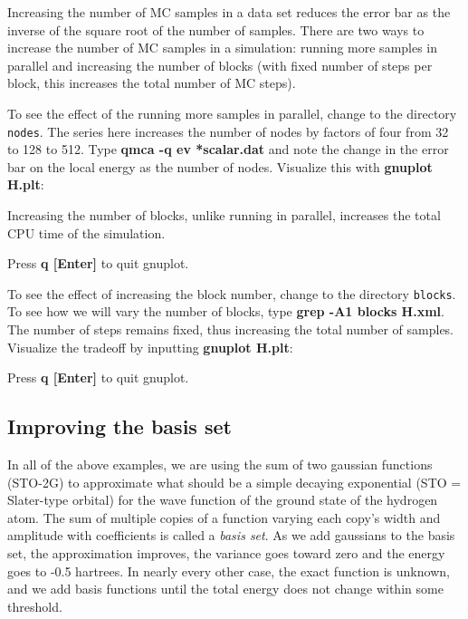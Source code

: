 Increasing the number of MC samples in a data set reduces the error bar as the
inverse of the square root of the number of samples.  There are two ways to
increase the number of MC samples in a simulation: running more samples in
parallel and increasing the number of blocks (with fixed number of steps per
block, this increases the total number of MC steps).

To see the effect of the running more samples in parallel, change to the
directory \texttt{nodes}.  The series here increases the number of nodes by
factors of four from 32 to 128 to 512.  Type \textbf{qmca -q ev *scalar.dat}
and note the change in the error bar on the local energy as the number of
nodes.  Visualize this with \textbf{gnuplot H.plt}:


Increasing the number of blocks, unlike running in parallel, increases the
total CPU time of the simulation.  

Press \textbf{q [Enter]} to quit gnuplot.

To see the effect of increasing the block number, change to the directory
\texttt{blocks}. To see how we will vary the number of blocks, type
\textbf{grep -A1 blocks H.xml}.  The number of steps remains fixed, thus
increasing the total number of samples.   Visualize the tradeoff by inputting
\textbf{gnuplot H.plt}: 


Press \textbf{q [Enter]} to quit gnuplot.

\subsection{Improving the basis set}

In all of the above examples, we are using the sum of two gaussian functions
(STO-2G) to approximate what should be a simple decaying exponential (STO =
Slater-type orbital) for the wave function of the ground state of the hydrogen
atom.  The sum of multiple copies of a function varying each copy's width and
amplitude with coefficients is called a \textit{basis set}. As we add gaussians
to the basis set, the approximation improves, the variance goes toward zero and
the energy goes to -0.5 hartrees.  In nearly every other case, the exact
function is unknown, and we add basis functions until the total energy does not
change within some threshold.

